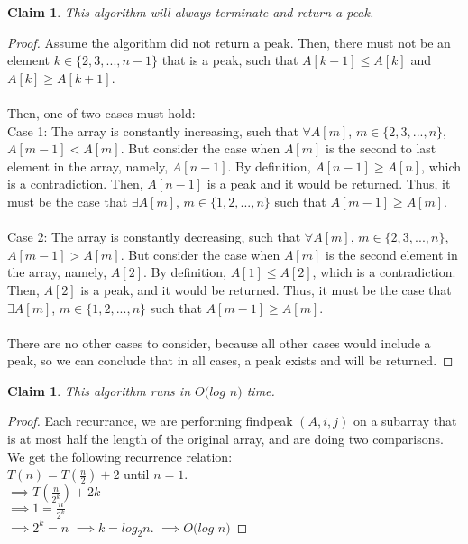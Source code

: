 \documentclass[11pt]{article}
\newtheorem{claim}[theorem]{Claim}
\begin{document}
	\begin{claim} 
	This algorithm will always terminate and return a peak.
\end{claim}

\begin{proof}
	Assume the algorithm did not return a peak. Then, there must not be an element $k \in \{2, 3, ..., n-1\}$ that is a peak, such that $A[k-1] \leq A[k]$ and $A[k] \geq A[k+1]$. \\
	\\ 
	Then, one of two cases must hold:\\
	Case 1: The array is constantly increasing, such that $\forall A[m]$, $m \in \{2, 3, ..., n\}$, $A[m-1] < A[m]$. But consider the case when $A[m]$ is the second to last element in the array, namely, $A[n-1]$. By definition, $A[n-1] \geq A[n]$, which is a contradiction. Then, $A[n-1]$ is a peak and it would be returned. Thus, it must be the case that $\exists A[m]$, $m \in \{1, 2, ... , n\}$ such that $A[m-1] \geq A[m]$.\\
	\\
	Case 2:  The array is constantly decreasing, such that $\forall A[m]$, $m \in \{2, 3, ..., n\}$, $A[m-1] > A[m]$. But consider the case when $A[m]$ is the second element in the array, namely, $A[2]$. By definition, $A[1] \leq A[2]$, which is a contradiction. Then, $A[2]$ is a peak, and it would be returned. Thus, it must be the case that $\exists A[m]$, $m \in \{1, 2, ... , n\}$ such that $A[m-1] \geq A[m]$.\\ 
	\\
	There are no other cases to consider, because all other cases would include a peak, so we can conclude that in all cases, a peak exists and will be returned.
	
\end{proof}

	\begin{claim} 
		This algorithm runs in $O (log$ $n)$ time.
	\end{claim}

	\begin{proof}
		Each recurrance, we are performing findpeak $(A ,i, j)$ on a subarray that is at most half the length of the original array, and are doing two comparisons.
		We get the following recurrence relation: \\
		$T(n) = T(\frac{n}{2}) + 2$ until $n = 1$. \\
		$\implies T(\frac{n}{2^k}) + 2k$\\
		$\implies 1 = \frac{n}{2^k}$\\
		$\implies 2^k = n$
		$\implies k = log_2 n$. 
		$\implies O(log$ $n)$
	\end{proof}

	\newpage
\end{document}
